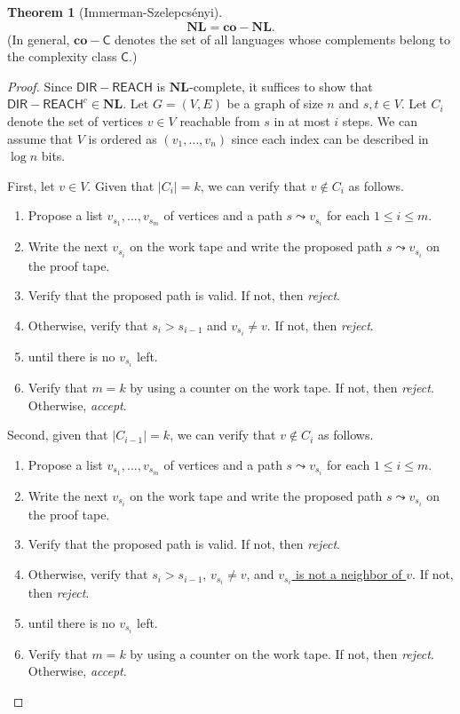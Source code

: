 \documentclass[10pt,letterpaper,cm]{nupset}
\theoremstyle{definition}
\theoremstyle{theorem}
\newtheorem{theorem}[definition]{Theorem}
\theoremstyle{remark}
\newcommand{\1}{\mathbf{1}}
\newcommand{\0}{\vec 0}
\begin{document}
\begin{theorem}[Immerman-Szelepcs\'enyi]
$$\mathbf{NL} = \mathbf{co}{-}{\mathbf{NL}}.$$ (In general, $\mathbf{co}{-}\mathsf{C}$ denotes the set of all languages whose complements belong to the complexity class $\mathsf{C}$.)
\end{theorem}
\begin{proof}
Since $\mathsf{DIR{-}REACH}$ is $\mathbf{NL}$-complete, it suffices to show that $\mathsf{DIR{-}REACH}^c\in \mathbf{NL}.$  
Let $G= \left(V, E\right)$ be a graph of size $n$ and $s, t\in V$. Let $C_i$ denote the set of vertices $v\in V$ reachable from $s$ in at most $i$ steps. We can assume that $V$ is ordered as $\left(v_1, \ldots, v_n\right)$ since each index can be described in $\log{n}$ bits.

\medskip

First, let $v\in V$. Given that $\left\lvert{C_i}\right\rvert = k$, we can verify that $v \notin C_i$ as follows. 
\begin{enumerate}
\item Propose a list $v_{s_1}, \ldots, v_{s_m}$ of vertices and a path $s\leadsto v_{s_i}$ for each $1\leq i \leq m$. 
\item Write the next $v_{s_i}$ on the work tape and write the proposed path $s \leadsto v_{s_i}$ on the proof tape. 
\item Verify that the proposed path is valid. If not, then \textit{reject}.
\item Otherwise, verify that $s_i > s_{i-1}$ and $v_{s_i} \ne v$. If not, then \textit{reject}. 
\item {} until there is no $v_{s_i}$ left. 
\item Verify that $m = k$ by using a counter on the work tape. If not, then \textit{reject}. Otherwise, \textit{accept}.
\end{enumerate}

\smallskip

Second, given that $\left\lvert{C_{i-1}}\right\rvert = k$,  we can verify that $v\notin C_i$ as follows.
\begin{enumerate}
\item Propose a list $v_{s_1}, \ldots, v_{s_m}$ of vertices and a path $s\leadsto v_{s_i}$ for each $1\leq i \leq m$. 
\item Write the next $v_{s_i}$ on the work tape and write the proposed path $s \leadsto v_{s_i}$ on the proof tape. 
\item Verify that the proposed path is valid. If not, then \textit{reject}.
\item Otherwise, verify that $s_i > s_{i-1}$, $v_{s_i} \ne v$, and \underline{$v_{s_i}$ is not a neighbor of $v$}. If not, then \textit{reject}. 
\item {} until there is no $v_{s_i}$ left. 
\item Verify that $m = k$ by using a counter on the work tape. If not, then \textit{reject}. Otherwise, \textit{accept}.
\end{enumerate}


\end{proof}
\end{document}
